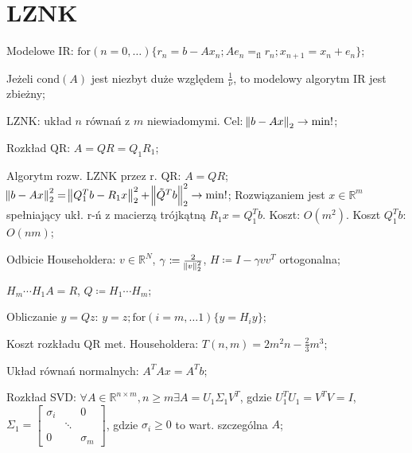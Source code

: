 \section{LZNK}

\entry
Modelowe IR:
$\mathrm{for}(n=0,\ldots)\{ r_n=b-Ax_n; Ae_n=_{\mathrm{fl}}r_n; x_{n+1} = x_n + e_n \}$;


\entry
Jeżeli $\mathrm{cond}(A)$ jest niezbyt duże względem $\frac{1}{\nu}$, to modelowy algorytm IR jest zbieżny;

\entry
LZNK: układ $n$ równań z $m$ niewiadomymi.
Cel: $\norm{b - Ax}_2 \to \min !$;

\entry
Rozkład QR:
$A = QR = Q_1R_1$;

\entry
Algorytm rozw. LZNK przez r. QR:
$A=QR$;
$\norm{b-Ax}^2_2 = \norm{Q^T_1b-R_1x}^2_2 + \norm{\tilde{Q}^Tb}^2_2 \to \min !$;
Rozwiązaniem jest $x\in \mathbb{R}^m$ spełniający ukł. r-ń z macierzą trójkątną $R_1x=Q_1^Tb$.
Koszt: $O(m^2)$.
Koszt $Q_1^Tb$: $O(nm)$;


\entry
Odbicie Householdera:
$v\in \mathbb{R}^N$,
$\gamma \coloneqq \frac{2}{\norm{v}^2_2} $,
$H\coloneqq I-\gamma vv^T$ ortogonalna;

\entry
$H_m \cdots H_1 A = R$, $Q \coloneqq H_1 \cdots H_m$;

\entry
Obliczanie $y=Qz$:
$y=z; \mathrm{for}(i=m,\ldots 1)\{y=H_iy\}$;

\entry
Koszt rozkładu QR met. Householdera: $T(n,m)=2m^2n - \frac{2}{3}m^3$;

\entry
Układ równań normalnych:
$A^TAx=A^Tb$;



\entry
Rozkład SVD:
$\forall A \in \mathbb{R}^{n\times m}, n \geq m \exists A=U_1\Sigma_1V^T$, gdzie
$U_1^TU_1=V^TV=I$,
$\Sigma_1 =\left[\begin{smallmatrix}
    \sigma_i    &           & 0 \\
                & \ddots    &   \\
    0           &           & \sigma_m
\end{smallmatrix}\right]
$, gdzie
$\sigma_i \geq 0$ to wart. szczególna $A$;

